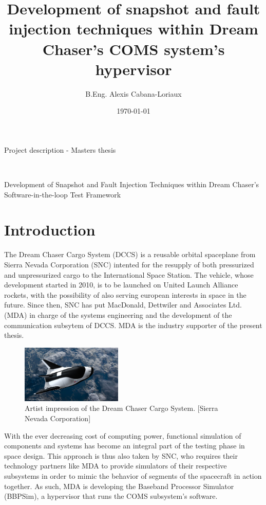 \documentclass[12pt,english]{rftthesis}
\title           {Development of snapshot and fault injection techniques within Dream Chaser's COMS system's hypervisor}
\author          {B.Eng. Alexis Cabana-Loriaux}
\date            {\today}
\begin{document}
\onehalfspacing

%
%
\begin{center}
\begin{large}
Project description - Masters thesis
\end{large}
\\
\vspace{.5cm}
\begin{LARGE}
Development of Snapshot and Fault Injection Techniques within Dream Chaser's Software-in-the-loop Test Framework
\end{LARGE}
\end{center}

%
%
\section*{Introduction}\label{sec:intro}
The Dream Chaser Cargo System (DCCS) is a reusable orbital spaceplane from Sierra Nevada Corporation (SNC) intented for the resupply of both pressurized and unpressurized cargo to the International Space Station. The vehicle, whose development started in 2010, is to be launched on United Launch Alliance rockets, with the possibility of also serving european interests in space in the future. Since then, SNC has put MacDonald, Dettwiler and Associates Ltd. (MDA) in charge of the systems engineering and the development of the communication subsytem of DCCS. MDA is the industry supporter of the present thesis.

\begin{figure}
\centering
\includegraphics[width=0.43\textwidth]{art/dccs}
\caption{\label{fig:dccs}Artist impression of the Dream Chaser Cargo System. [Sierra Nevada Corporation]}
\end{figure}

With the ever decreasing cost of computing power, functional simulation of components and systems has become an integral part of the testing phase in space design. This approach is thus also taken by SNC, who requires their technology partners like MDA to provide simulators of their respective subsystems in order to mimic the behavior of segments of the spacecraft in action together. As such, MDA is developing the Baseband Processor Simulator (BBPSim), a hypervisor that runs the COMS subsystem's software.
\end{document}
